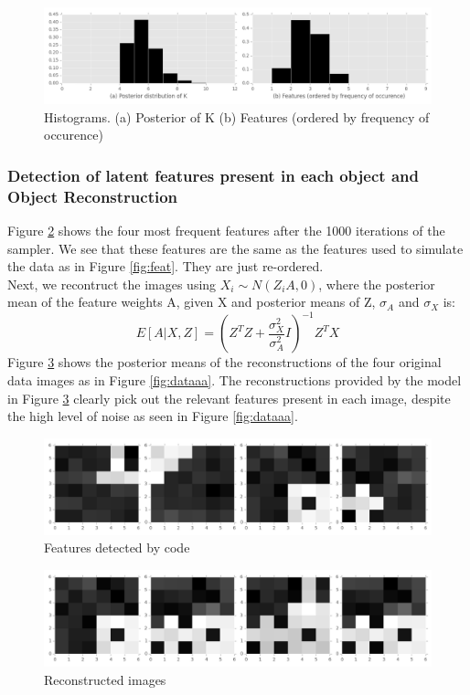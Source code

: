 \documentclass[11pt]{article}
\begin{document}
\begin{figure}
\includegraphics[width=\linewidth]{data_files/figures.png}
\caption {Histograms. (a) Posterior of K (b) Features (ordered by frequency of occurence)}
\label{fig:figur}
\end{figure}

\subsubsection{Detection of latent features present in each object and Object Reconstruction}
Figure \ref{fig:dat} shows the four most frequent features after the 1000 iterations of the sampler. We see that these features are the same as the features used to simulate the data as in Figure \ref{fig:feat}. They are just re-ordered.\\

Next, we recontruct the images using $X_{i} \sim N(Z_{i}A,0)$, where the posterior mean of the feature weights A, given X and posterior means of Z, $\sigma_{A}$ and $\sigma_{X}$ is:
\[
E[A|X,Z] = (Z^TZ+\frac{\sigma_X^2}{\sigma_A^2}I)^{-1}Z^TX
\]
Figure \ref{fig:da} shows the posterior means of the reconstructions of the four original data images as in Figure \ref{fig:dataaa}. The reconstructions provided by the model in Figure \ref{fig:da} clearly pick out the relevant features present in each image, despite the high level of noise as seen in Figure \ref{fig:dataaa}.\\

\begin{figure}
\includegraphics[width=\linewidth]{data_files/detected_features.png}
\caption {Features detected by code}
\label{fig:dat}
\end{figure}

\begin{figure}
\includegraphics[width=\linewidth]{data_files/detected_total_features.png}
\caption {Reconstructed images}
\label{fig:da}
\end{figure}
\end{document}
